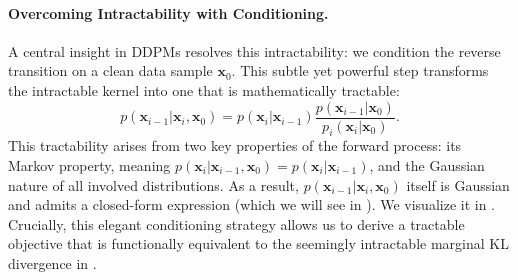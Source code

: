 \paragraph{Overcoming Intractability with Conditioning.}
A central insight in DDPMs resolves this intractability: we condition the reverse transition on a clean data sample $\mathbf{x}_0$. This subtle yet powerful step transforms the intractable kernel into one that is mathematically tractable:
\[
p(\mathbf{x}_{i-1}|\mathbf{x}_i, \mathbf{x}_0) = p(\mathbf{x}_i|\mathbf{x}_{i-1}) \frac{p(\mathbf{x}_{i-1}|\mathbf{x}_0)}{p_i(\mathbf{x}_i|\mathbf{x}_0)}.
\]
This tractability arises from two key properties of the forward process: its Markov property, meaning $p(\mathbf{x}_i|\mathbf{x}_{i-1}, \mathbf{x}_0) = p(\mathbf{x}_i|\mathbf{x}_{i-1})$, and the Gaussian nature of all involved distributions. As a result, $p(\mathbf{x}_{i-1}|\mathbf{x}_i, \mathbf{x}_0)$ itself is Gaussian and admits a closed-form expression (which we will see in ). We visualize it in . Crucially, this elegant conditioning strategy allows us to derive a tractable objective that is functionally equivalent to the seemingly intractable marginal KL divergence in .




